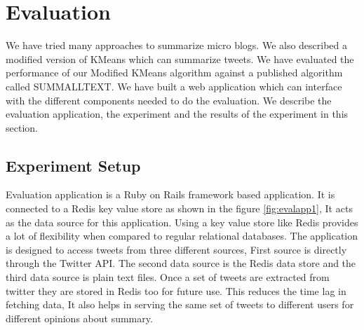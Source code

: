 \chapter{Evaluation}
\label{chap-five}
\newcommand{\ctheaders}[8]%
{\begin{tabular}{r|ccc||ccc|}
 \multicolumn{1}{r}{} & \multicolumn{3}{c}{#1}
      & \multicolumn{3}{c}{#2} \\ \cline{2-7}
 #3 %
      & \hspace{\cta} & #5 & \hspace{\cta}
      & \hspace{\cta} & #7 & \hspace{\cta}\ctstrut \\ \cline{2-7}
 #4 %
      & \hspace{\cta} & #6 & \hspace{\cta}
      & \hspace{\cta} & #8 & \hspace{\cta}\ctstrut \\ \cline{2-7}
\end{tabular}}

We have tried many approaches to summarize micro blogs. We also described a modified version of KMeans which can summarize tweets. We have evaluated the performance of our Modified KMeans algorithm against a published algorithm called SUMMALLTEXT\cite{DBLP:conf/icwsm/ChakrabartiP11}. We have built a web application which can interface with the different components needed to do the evaluation. We describe the evaluation application, the experiment and the results of the experiment in this section.

\section{Experiment Setup}
Evaluation application is a Ruby on Rails framework based application. It is connected to a Redis key value store as shown in the figure \ref{fig:evalapp1}, It acts as the data source for this application. Using a key value store like Redis provides a lot of flexibility when compared to regular relational databases. The application is designed to access tweets from three different sources, First source is directly through the Twitter API. The second data source is the Redis data store and the third data source is plain text files. Once a set of tweets are extracted from twitter they are stored in Redis too for future use. This reduces the time lag in fetching data, It also helps in serving the same set of tweets to different users for different opinions about summary. 

